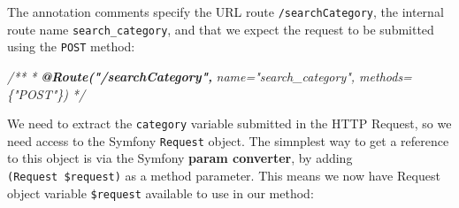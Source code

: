 \documentclass[a4paperpaper,openright]{book}
\newenvironment{Shaded}{}{}
\newcommand{\AnnotationTok}[1]{\textcolor[rgb]{0.38,0.63,0.69}{\textbf{\textit{#1}}}}
\newcommand{\CommentTok}[1]{\textcolor[rgb]{0.38,0.63,0.69}{\textit{#1}}}
\newcommand{\KeywordTok}[1]{\textcolor[rgb]{0.00,0.44,0.13}{\textbf{#1}}}
\newcommand{\NormalTok}[1]{#1}
\newcommand{\OtherTok}[1]{\textcolor[rgb]{0.00,0.44,0.13}{#1}}
\newcommand{\StringTok}[1]{\textcolor[rgb]{0.25,0.44,0.63}{#1}}
\begin{document}
\begin{Shaded}
\end{Shaded}

The annotation comments specify the URL route \texttt{/searchCategory},
the internal route name \texttt{search\_category}, and that we expect
the request to be submitted using the \texttt{POST} method:

\begin{Shaded}
\begin{Highlighting}[]
    \CommentTok{/**}
\CommentTok{     * }\AnnotationTok{@Route("/searchCategory",}\CommentTok{ name="search_category", methods=\{"POST"\})}
\CommentTok{     */}
\end{Highlighting}
\end{Shaded}

We need to extract the \texttt{category} variable submitted in the HTTP
Request, so we need access to the Symfony \texttt{Request} object. The
simnplest way to get a reference to this object is via the Symfony
\textbf{param converter}, by adding \texttt{(Request\ \$request)} as a
method parameter. This means we now have Request object variable
\texttt{\$request} available to use in our method:

\begin{Shaded}
\end{Shaded}
\end{document}
